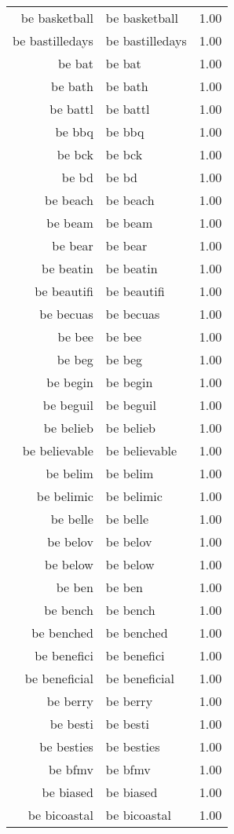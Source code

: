 \begin{table}[ht]
\begin{tabular}{rlr}
  be basketball & be basketball & 1.00 \\ 
  be bastilledays & be bastilledays & 1.00 \\ 
  be bat & be bat & 1.00 \\ 
  be bath & be bath & 1.00 \\ 
  be battl & be battl & 1.00 \\ 
  be bbq & be bbq & 1.00 \\ 
  be bck & be bck & 1.00 \\ 
  be bd & be bd & 1.00 \\ 
  be beach & be beach & 1.00 \\ 
  be beam & be beam & 1.00 \\ 
  be bear & be bear & 1.00 \\ 
  be beatin & be beatin & 1.00 \\ 
  be beautifi & be beautifi & 1.00 \\ 
  be becuas & be becuas & 1.00 \\ 
  be bee & be bee & 1.00 \\ 
  be beg & be beg & 1.00 \\ 
  be begin & be begin & 1.00 \\ 
  be beguil & be beguil & 1.00 \\ 
  be belieb & be belieb & 1.00 \\ 
  be believable & be believable & 1.00 \\ 
  be belim & be belim & 1.00 \\ 
  be belimic & be belimic & 1.00 \\ 
  be belle & be belle & 1.00 \\ 
  be belov & be belov & 1.00 \\ 
  be below & be below & 1.00 \\ 
  be ben & be ben & 1.00 \\ 
  be bench & be bench & 1.00 \\ 
  be benched & be benched & 1.00 \\ 
  be benefici & be benefici & 1.00 \\ 
  be beneficial & be beneficial & 1.00 \\ 
  be berry & be berry & 1.00 \\ 
  be besti & be besti & 1.00 \\ 
  be besties & be besties & 1.00 \\ 
  be bfmv & be bfmv & 1.00 \\ 
  be biased & be biased & 1.00 \\ 
  be bicoastal & be bicoastal & 1.00 \\ 

\end{tabular}
\end{table}
